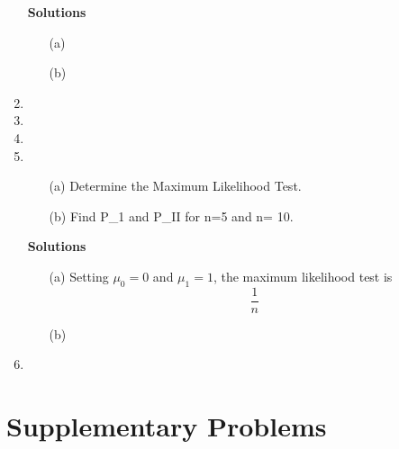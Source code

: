 \begin{enumerate}
\noindent \textbf{Solutions}
\begin{itemize}
\item[(a)]
\item[(b)]
\end{itemize}

\item


\item


\item


\item 

\begin{itemize}
\item[(a)] Determine the Maximum Likelihood Test.
\item[(b)] Find P_1 and P_{II} for n=5 and n= 10.
\end{itemize}

\noindent \textbf{Solutions}
\begin{itemize}
\item[(a)] Setting $\mu_0 = 0$ and $\mu_1 = 1$, the maximum likelihood test is
\[  \frac{1}{n}  \]

\item[(b)]
\end{itemize}



\item

\end{enumerate}

\section{Supplementary Problems}

